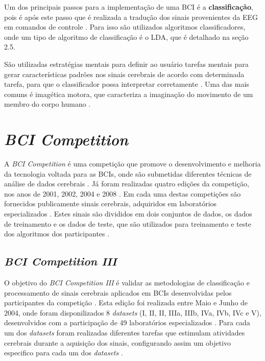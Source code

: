 Um dos principais passos para a implementação de uma
BCI é a \textbf{classificação}, pois é após este passo que é realizada a tradução dos sinais provenientes da EEG
em comandos de controle \cite{MasonAndBirch}. Para isso são utilizados algoritmos classificadores, onde um tipo de algoritmo de classificação é o LDA, que é detalhado na seção 2.5.

São utilizadas estratégias mentais para definir ao usuário tarefas mentais para gerar características padrões nos sinais cerebrais de acordo com determinada tarefa, para que o classificador possa interpretar corretamente \cite{SIULYDissertacao}. Uma das mais comuns é imagética motora, que caracteriza a imaginação do movimento de um membro do corpo humano \cite{SIULYDissertacao}.  

\section{\textit{BCI Competition}}
A \textit{BCI Competition} é uma competição que promove o desenvolvimento e melhoria da tecnologia voltada para as BCIs, onde são submetidas diferentes técnicas de análise de dados cerebrais \cite{BCICompetition}. Já foram realizadas quatro edições da competição, nos anos de 2001, 2002, 2004 e 2008 \cite{BCICompetition}. Em cada uma destas competições são fornecidos publicamente sinais cerebrais, adquiridos em laboratórios especializados \cite{BCICompetition}. Estes sinais são divididos em dois conjuntos de dados, os dados de treinamento e os dados de teste, que são utilizados para treinamento e teste dos algoritmos dos participantes \cite{BCICompetition}.

\subsection{\textit{BCI Competition III}}
O objetivo do \textit{BCI Competition III} é validar as metodologias de classificação e processamento de sinais cerebrais aplicados em BCIs desenvolvidas pelos participantes da competição \cite{siteBCI}. Esta edição foi realizada entre Maio e Junho de 2004, onde foram disponilizados 8 \textit{datasets} (I, II, II, IIIa, IIIb, IVa, IVb, IVc e V), desenvolvidos com a participação de 49 laboratórios especializados \cite{BCICompetition}.
Para cada um dos \textit{datasets} foram realizadas diferentes tarefas que estimulam atividades cerebrais durante a aquisição dos sinais, configurando assim um objetivo especifico para cada um dos \textit{datasets} \cite{siteBCI}.

